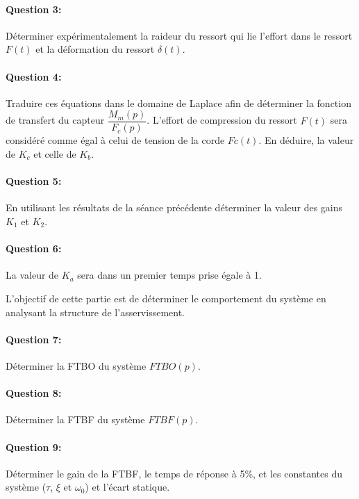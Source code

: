 \paragraph{Question 3:} Déterminer expérimentalement la raideur du ressort qui lie l'effort dans le ressort $F(t)$ et la déformation du ressort $\delta(t)$.

\paragraph{Question 4:} Traduire ces équations dans le domaine de Laplace afin de déterminer la fonction de transfert du capteur $\dfrac{M_m(p)}{F_c(p)}$. L'effort de compression du ressort $F(t)$ sera considéré comme égal à celui de tension de la corde $Fc(t)$. En déduire, la valeur de $K_c$ et celle de $K_b$.

\paragraph{Question 5:} En utilisant les résultats de la séance précédente déterminer la valeur des gains $K_1$ et $K_2$.

\paragraph{Question 6:} La valeur de $K_a$ sera dans un premier temps prise égale à 1.

\ifdef{\public}{\cleardoublepage}{}


L'objectif de cette partie est de déterminer le comportement du système en analysant la structure de l'asservissement.
~\

\paragraph{Question 7:} Déterminer la FTBO du système $FTBO(p)$.

\paragraph{Question 8:} Déterminer la FTBF du système $FTBF(p)$.

\paragraph{Question 9:} Déterminer le gain de la FTBF, le temps de réponse à 5\%, et les constantes du système ($\tau$, $\xi$ et $\omega_0$) et l'écart statique.

